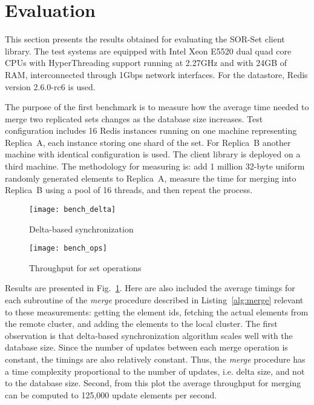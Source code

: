 \section{Evaluation}
\label{sec:evaluation}

This section presents the results obtained for evaluating the SOR-Set client
library. The test systems are equipped with Intel Xeon E5520 dual quad core
CPUs with HyperThreading support running at 2.27GHz and with 24GB of RAM,
interconnected through 1Gbps network interfaces. For the datastore, Redis
version 2.6.0-rc6 is used.

The purpose of the first benchmark is to measure how the average time needed to
merge two replicated sets changes as the database size increases. Test
configuration includes 16 Redis instances running on one machine representing
Replica~A, each instance storing one shard of the set. For Replica~B another
machine with identical configuration is used. The client library is deployed
on a third machine. The methodology for measuring is: add 1 million 32-byte
uniform randomly generated elements to Replica~A, measure the time for merging
into Replica~B using a pool of 16 threads, and then repeat the process.

\begin{figure}[t]
  \centering
  \begin{minipage}{1\linewidth}
    \centering
    \texttt{[image: bench\_delta]}
    \caption{Delta-based synchronization}
    \label{fig:bench_delta}
  \end{minipage}
\end{figure}

\begin{figure}[t]
  \centering
  \begin{minipage}{1\linewidth}
    \centering
    \texttt{[image: bench\_ops]}
    \caption{Throughput for set operations}
    \label{fig:bench_ops}
  \end{minipage}
\end{figure}

Results are presented in Fig.~\ref{fig:bench_delta}. Here are also included
the average timings for each subroutine  of the \textit{merge} procedure
described in Listing~\ref{alg:merge} relevant to these measurements:
getting the element ids, fetching the actual elements from the remote
cluster, and adding the elements to the local cluster. The first observation is
that delta-based synchronization algorithm scales well with the database size.
Since the number of updates between each merge operation is constant, the
timings are also relatively constant. Thus, the \textit{merge} procedure has a
time complexity proportional to the number of updates, i.e. delta size, and not
to the database size. Second, from this plot the average throughput for merging
can be computed to 125,000 update elements per second.

